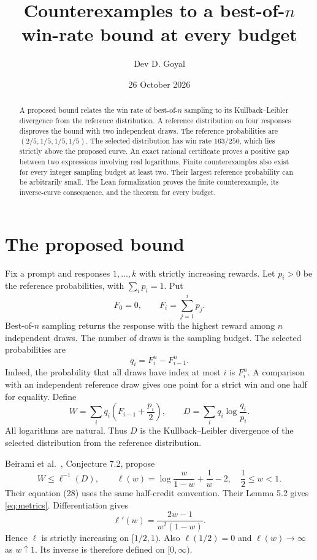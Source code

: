 \documentclass[11pt,a4paper]{article}
\title{Counterexamples to a best-of-$n$ win-rate bound at every budget}
\author{Dev D. Goyal}
\date{26 October 2026}
\begin{document}
\maketitle
\begin{abstract}
A proposed bound relates the win rate of best-of-$n$ sampling to its Kullback--Leibler divergence from the reference distribution. A reference distribution on four responses disproves the bound with two independent draws. The reference probabilities are $(2/5,1/5,1/5,1/5)$. The selected distribution has win rate $163/250$, which lies strictly above the proposed curve. An exact rational certificate proves a positive gap between two expressions involving real logarithms. Finite counterexamples also exist for every integer sampling budget at least two. Their largest reference probability can be arbitrarily small. The Lean formalization proves the finite counterexample, its inverse-curve consequence, and the theorem for every budget.
\end{abstract}

\section{The proposed bound}
Fix a prompt and responses $1,\ldots,k$ with strictly increasing rewards. Let $p_i>0$ be the reference probabilities, with $\sum_i p_i=1$. Put
\[
 F_0=0,\qquad F_i=\sum_{j=1}^i p_j.
\]
Best-of-$n$ sampling returns the response with the highest reward among $n$ independent draws. The number of draws is the sampling budget. The selected probabilities are
\begin{equation}\label{eq:q}
 q_i=F_i^n-F_{i-1}^n.
\end{equation}
Indeed, the probability that all draws have index at most $i$ is $F_i^n$.
A comparison with an independent reference draw gives one point for a strict win and one half for equality. Define
\begin{equation}\label{eq:metrics}
 W=\sum_i q_i\left(F_{i-1}+\frac{p_i}{2}\right),
 \qquad D=\sum_i q_i\log\frac{q_i}{p_i}.
\end{equation}
All logarithms are natural. Thus $D$ is the Kullback--Leibler divergence of the selected distribution from the reference distribution.

Beirami et al.\ \cite{beirami}, Conjecture 7.2, propose
\begin{equation}\label{eq:conjecture}
 W\leq \ell^{-1}(D),\qquad
 \ell(w)=\log\frac{w}{1-w}+\frac1w-2,
 \quad \frac12\leq w<1.
\end{equation}
Their equation (28) uses the same half-credit convention. Their Lemma 5.2 gives \eqref{eq:metrics}.
Differentiation gives
\[
 \ell'(w)=\frac{2w-1}{w^2(1-w)}.
\]
Hence $\ell$ is strictly increasing on $[1/2,1)$. Also $\ell(1/2)=0$ and $\ell(w)\to\infty$ as $w\uparrow1$. Its inverse is therefore defined on $[0,\infty)$.
\end{document}
